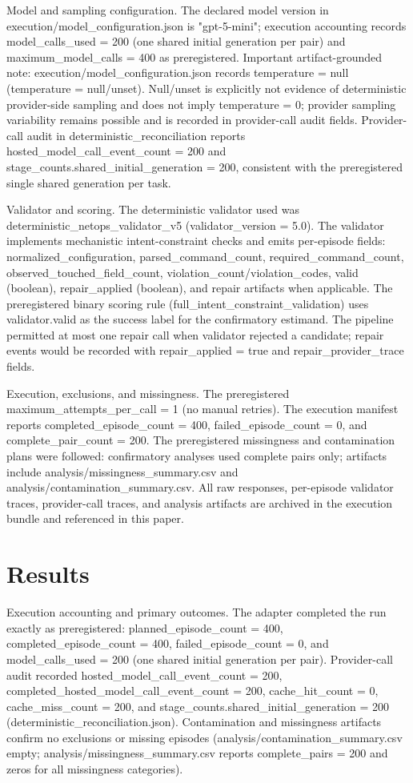 \documentclass[conference]{IEEEtran}
\begin{document}
Model and sampling configuration. The declared model version in execution/model\_configuration.json is "gpt-5-mini"; execution accounting records model\_calls\_used = 200 (one shared initial generation per pair) and maximum\_model\_calls = 400 as preregistered. Important artifact-grounded note: execution/model\_configuration.json records temperature = null (temperature = null/unset). Null/unset is explicitly not evidence of deterministic provider-side sampling and does not imply temperature = 0; provider sampling variability remains possible and is recorded in provider-call audit fields. Provider-call audit in deterministic\_reconciliation reports hosted\_model\_call\_event\_count = 200 and stage\_counts.shared\_initial\_generation = 200, consistent with the preregistered single shared generation per task.

Validator and scoring. The deterministic validator used was deterministic\_netops\_validator\_v5 (validator\_version = 5.0). The validator implements mechanistic intent-constraint checks and emits per-episode fields: normalized\_configuration, parsed\_command\_count, required\_command\_count, observed\_touched\_field\_count, violation\_count/violation\_codes, valid (boolean), repair\_applied (boolean), and repair artifacts when applicable. The preregistered binary scoring rule (full\_intent\_constraint\_validation) uses validator.valid as the success label for the confirmatory estimand. The pipeline permitted at most one repair call when validator rejected a candidate; repair events would be recorded with repair\_applied = true and repair\_provider\_trace fields.

Execution, exclusions, and missingness. The preregistered maximum\_attempts\_per\_call = 1 (no manual retries). The execution manifest reports completed\_episode\_count = 400, failed\_episode\_count = 0, and complete\_pair\_count = 200. The preregistered missingness and contamination plans were followed: confirmatory analyses used complete pairs only; artifacts include analysis/missingness\_summary.csv and analysis/contamination\_summary.csv. All raw responses, per-episode validator traces, provider-call traces, and analysis artifacts are archived in the execution bundle and referenced in this paper.

\section{Results}
Execution accounting and primary outcomes. The adapter completed the run exactly as preregistered: planned\_episode\_count = 400, completed\_episode\_count = 400, failed\_episode\_count = 0, and model\_calls\_used = 200 (one shared initial generation per pair). Provider-call audit recorded hosted\_model\_call\_event\_count = 200, completed\_hosted\_model\_call\_event\_count = 200, cache\_hit\_count = 0, cache\_miss\_count = 200, and stage\_counts.shared\_initial\_generation = 200 (deterministic\_reconciliation.json). Contamination and missingness artifacts confirm no exclusions or missing episodes (analysis/contamination\_summary.csv empty; analysis/missingness\_summary.csv reports complete\_pairs = 200 and zeros for all missingness categories).
\end{document}
